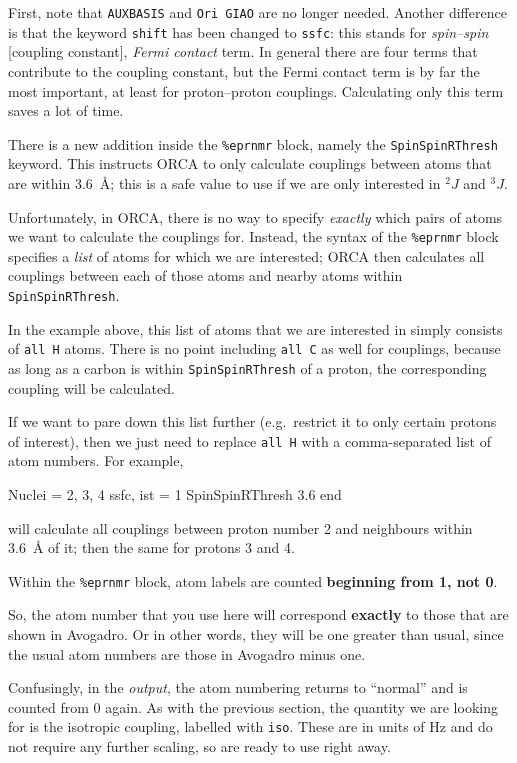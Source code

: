\documentclass[10pt]{article}
\begin{document}
First, note that \texttt{AUXBASIS} and \texttt{Ori GIAO} are no longer needed. Another difference is that the keyword \texttt{shift} has been changed to \texttt{ssfc}: this stands for \textit{spin--spin} [coupling constant], \textit{Fermi contact} term. In general there are four terms that contribute to the coupling constant, but the Fermi contact term is by far the most important, at least for proton--proton couplings. Calculating only this term saves a lot of time.

There is a new addition inside the \texttt{\%eprnmr} block, namely the \texttt{SpinSpinRThresh} keyword. This instructs ORCA to only calculate couplings between atoms that are within \SI{3.6}{\angstrom}; this is a safe value to use if we are only interested in \({}^{2}J\) and \({}^{3}J\).

Unfortunately, in ORCA, there is no way to specify \textit{exactly} which pairs of atoms we want to calculate the couplings for. Instead, the syntax of the \texttt{\%eprnmr} block specifies a \textit{list} of atoms for which we are interested; ORCA then calculates all couplings between each of those atoms and nearby atoms within \texttt{SpinSpinRThresh}.

In the example above, this list of atoms that we are interested in simply consists of \texttt{all H} atoms. There is no point including \texttt{all C} as well for  couplings, because as long as a carbon is within \texttt{SpinSpinRThresh} of a proton, the corresponding coupling will be calculated.

If we want to pare down this list further (e.g.\ restrict it to only certain protons of interest), then we just need to replace \texttt{all H} with a comma-separated list of atom numbers. For example,

\begin{cmdline}
  Nuclei = 2, 3, 4 { ssfc, ist = 1 }
  SpinSpinRThresh 3.6
end
\end{cmdline}

will calculate all couplings between proton number 2 and neighbours within \SI{3.6}{\angstrom} of it; then the same for protons 3 and 4.

\begin{warning}
Within the \texttt{\%eprnmr} block, atom labels are counted \textbf{beginning from 1, not 0}.
\end{warning}

So, the atom number that you use here will correspond \textbf{exactly} to those that are shown in Avogadro. Or in other words, they will be one greater than usual, since the usual atom numbers are those in Avogadro minus one.

Confusingly, in the \textit{output}, the atom numbering returns to ``normal'' and is counted from 0 again. As with the previous section, the quantity we are looking for is the isotropic coupling, labelled with \texttt{iso}. These are in units of Hz and do not require any further scaling, so are ready to use right away.

\printbibliography
\end{document}
